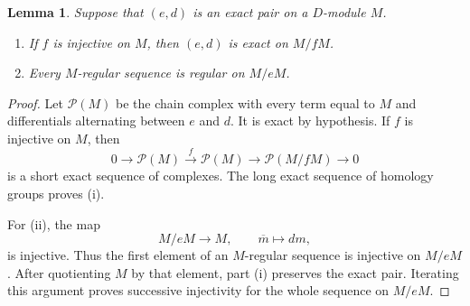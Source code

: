\documentclass[11pt,reqno]{amsart}
\newtheorem{lemma}[lemma]{Lemma}
\begin{document}
\begin{lemma}\label{lem:compact-exact-regular}
Suppose that $(e,d)$ is an exact pair on a $D$-module $M$.
\begin{enumerate}[label=\textup{(\roman*)},leftmargin=3em]
\item If $f$ is injective on $M$, then $(e,d)$ is exact on $M/fM$.
\item Every $M$-regular sequence is regular on $M/eM$.
\end{enumerate}
\end{lemma}
\begin{proof}
Let $\mathcal P(M)$ be the chain complex with every term equal to $M$ and differentials alternating between $e$ and $d$. It is exact by hypothesis. If $f$ is injective on $M$, then
\[
0\longrightarrow\mathcal P(M)\xrightarrow{f}\mathcal P(M) \longrightarrow\mathcal P(M/fM)\longrightarrow0
\]
is a short exact sequence of complexes. The long exact sequence of homology groups proves \textup{(i)}.

For \textup{(ii)}, the map
\[
M/eM\longrightarrow M,\qquad \overline m\longmapsto dm,
\]
is injective. Thus the first element of an $M$-regular sequence is injective on $M/eM$. After quotienting $M$ by that element, part \textup{(i)} preserves the exact pair. Iterating this argument proves successive injectivity for the whole sequence on $M/eM$.
\end{proof}
\end{document}
